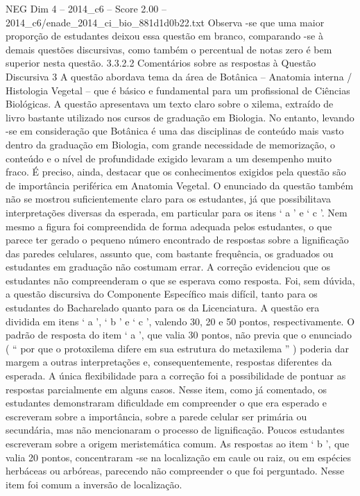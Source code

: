 \begin{textsample}{NEG Dim 4 – 2014\_c6 – Score 2.00 – 2014\_c6/enade\_2014\_ci\_bio\_881d1d0b22.txt}
Observa -se que uma maior proporção de estudantes deixou essa questão em branco, comparando -se à demais questões discursivas, como também o percentual de notas zero é bem superior nesta questão. 3.3.2.2 Comentários sobre as respostas à Questão Discursiva 3 A questão abordava tema da área de Botânica – Anatomia interna / Histologia Vegetal – que é básico e fundamental para um profissional de Ciências Biológicas.
A questão apresentava um texto claro sobre o xilema, extraído de livro bastante utilizado nos cursos de graduação em Biologia.
No entanto, levando -se em consideração que Botânica é uma das disciplinas de conteúdo mais vasto dentro da graduação em Biologia, com grande necessidade de memorização, o conteúdo e o nível de profundidade exigido levaram a um desempenho muito fraco.
É preciso, ainda, destacar que os conhecimentos exigidos pela questão são de importância periférica em Anatomia Vegetal.
O enunciado da questão também não se mostrou suficientemente claro para os estudantes, já que possibilitava interpretações diversas da esperada, em particular para os itens ‘ a ’ e ‘ c ’.
Nem mesmo a figura foi compreendida de forma adequada pelos estudantes, o que parece ter gerado o pequeno número encontrado de respostas sobre a lignificação das paredes celulares, assunto que, com bastante frequência, os graduados ou estudantes em graduação não costumam errar.
A correção evidenciou que os estudantes não compreenderam o que se esperava como resposta.
Foi, sem dúvida, a questão discursiva do Componente Específico mais difícil, tanto para os estudantes do Bacharelado quanto para os da Licenciatura.
A questão era dividida em itens ‘ a ’, ‘ b ’ e ‘ c ’, valendo 30, 20 e 50 pontos, respectivamente.
O padrão de resposta do item ‘ a ’, que valia 30 pontos, não previa que o enunciado ( “ por que o protoxilema difere em sua estrutura do metaxilema ” ) poderia dar margem a outras interpretações e, consequentemente, respostas diferentes da esperada.
A única flexibilidade para a correção foi a possibilidade de pontuar as respostas parcialmente em alguns casos.
Nesse item, como já comentado, os estudantes demonstraram dificuldade em compreender o que era esperado e escreveram sobre a importância, sobre a parede celular ser primária ou secundária, mas não mencionaram o processo de lignificação.
Poucos estudantes escreveram sobre a origem meristemática comum.
As respostas ao item ‘ b ’, que valia 20 pontos, concentraram -se na localização em caule ou raiz, ou em espécies herbáceas ou arbóreas, parecendo não compreender o que foi perguntado.
Nesse item foi comum a inversão de localização.

\end{textsample}
